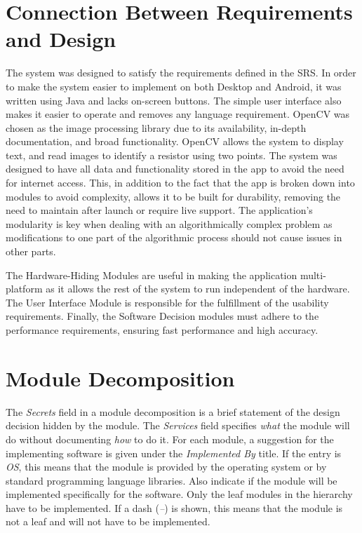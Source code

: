 \documentclass[12pt, titlepage]{article}
\begin{document}
\section{Connection Between Requirements and Design} \label{SecConnection}
\par The system was designed to satisfy the requirements defined in the SRS. In order to make the system easier to implement on both Desktop and Android, it was written using Java and lacks on-screen buttons. The simple user interface also makes it easier to operate and removes any language requirement. OpenCV was chosen as the image processing library due to its availability, in-depth documentation, and broad functionality. OpenCV allows the system to display text, and read images to identify a resistor using two points. 
The system was designed to have all data and functionality stored in the app to avoid the need for internet access. This, in addition to the fact that the app is broken down into modules to avoid complexity, allows it to be built for durability, removing the need to maintain after launch or require live support. The application's modularity is key when dealing with an algorithmically complex problem as modifications to one part of the algorithmic process should not cause issues in other parts.
\par The Hardware-Hiding Modules are useful in making the application multi-platform as it allows the rest of the system to run independent of the hardware. The User Interface Module is responsible for the fulfillment of the usability requirements. Finally, the Software Decision modules must adhere to the performance requirements, ensuring fast performance and high accuracy.

\section{Module Decomposition} \label{SecMD}

The \emph{Secrets} field in a module decomposition is a brief statement of the design decision hidden by the module. 
The \emph{Services} field specifies \emph{what} the module will do without documenting \emph{how} to do it. 
For each module, a suggestion for the implementing software is given under the \emph{Implemented By} title. 
If the entry is \emph{OS}, this means that the module is provided by the operating system or by standard programming language libraries.
Also indicate if the module will be implemented specifically for the software.
Only the leaf modules in the hierarchy have to be implemented. 
If a dash (\emph{--}) is shown, this means that the module is not a leaf and will not have to be implemented. 
\end{document}
